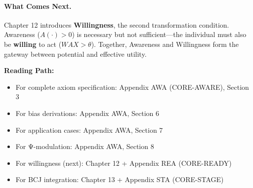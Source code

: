 \paragraph{What Comes Next.}
Chapter 12 introduces \textbf{Willingness}, the second transformation condition.
Awareness ($A(\cdot) > 0$) is necessary but not sufficient---the individual must
also be \textbf{willing} to act ($WAX > \theta$). Together, Awareness and Willingness
form the gateway between potential and effective utility.

\begin{cross-reference}
\textbf{Reading Path:}
\begin{itemize}
    \item For complete axiom specification: Appendix AWA (CORE-AWARE), Section 3
    \item For bias derivations: Appendix AWA, Section 6
    \item For application cases: Appendix AWA, Section 7
    \item For Ψ-modulation: Appendix AWA, Section 8
    \item For willingness (next): Chapter 12 + Appendix REA (CORE-READY)
    \item For BCJ integration: Chapter 13 + Appendix STA (CORE-STAGE)
\end{itemize}
\end{cross-reference}



